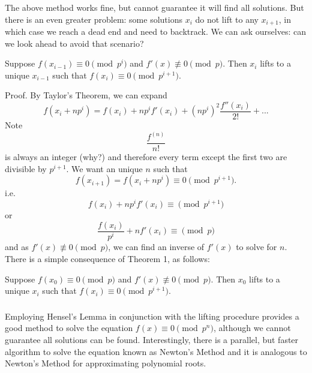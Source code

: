\documentclass{article}
\begin{document}
\subsubsection{}
The above method works fine, but cannot guarantee it will find all solutions. But there is an even greater problem: some solutions $x_{i}$ do not lift to any $x_{i+1}$, in which case we reach a dead end and need to backtrack. We can ask ourselves: can we look ahead to avoid that scenario?

\begin{thm}
    Suppose $f(x_{i-1}) \equiv 0 \pmod{p^{i}}$ and $f'(x) \not\equiv 0 \pmod{p}$. Then $x_{i}$ lifts to a unique $x_{i-1}$ such that $f(x_{i}) \equiv 0 \pmod{p^{i+1}}$.
\end{thm}
Proof. By Taylor's Theorem, we can expand
\begin{equation}
    f(x_{i}+np^{i}) = f(x_{i}) + np^{i}f'(x_{i}) +
    (np^{i})^{2}\frac{f''(x_{i})}{2!} + ...
\end{equation}
Note $$\frac{f^{(n)}}{n!}$$ is always an integer (why?) and therefore every term except the first two are divisible by $p^{i+1}$. We want an unique $n$ such that
\begin{equation}
    f(x_{i+1}) = f(x_{i}+np^{i}) \equiv 0 \pmod{p^{i+1}}.
\end{equation}
i.e.
\begin{equation}
    f(x_{i}) +  np^{i}f'(x_{i}) \equiv \pmod{p^{i+1}}
\end{equation}
or
\begin{equation}
    \frac{f(x_{i})}{p^{i}} +  nf'(x_{i}) \equiv \pmod{p}
\end{equation}
and as $f'(x) \not\equiv 0 \pmod{p}$, we can find an inverse of $f'(x)$ to solve for $n$.
There is a simple consequence of Theorem 1, as follows:
\begin{thm}[Hensel]
    Suppose $f(x_{0}) \equiv 0 \pmod{p}$ and $f'(x) \not\equiv 0 \pmod{p}$. Then $x_{0}$ lifts to a unique $x_{i}$ such that $f(x_{i}) \equiv 0 \pmod{p^{i+1}}$.
\end{thm}

\subsubsection{}
Employing Hensel's Lemma in conjunction with the lifting procedure provides a good method to solve the equation $f(x) \equiv 0 \pmod{p^{n}}$, although we cannot guarantee all solutions can be found. Interestingly, there is a parallel, but faster algorithm to solve the equation known as Newton's Method and it is analogous to Newton's Method for approximating polynomial roots.
\end{document}
